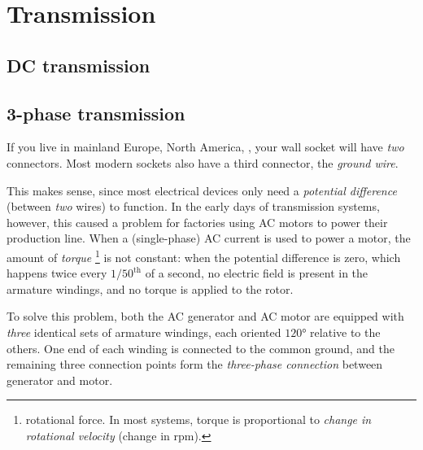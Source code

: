 \documentclass[main.tex]{subfiles}
\begin{document}
\section{Transmission}
\subsection{DC transmission}


\subsection{3-phase transmission}

\towrite{}

If you live in mainland Europe, North America, \todo{}, your wall socket will have \emph{two} connectors. Most modern sockets also have a third connector, the \emph{ground wire}. 

This makes sense, since most electrical devices only need a \emph{potential difference} (between \emph{two} wires) to function. In the early days of transmission systems, however, this caused a problem for factories using AC motors to power their production line. When a (single-phase) AC current is used to power a motor, the amount of \emph{torque} 
\footnote{\ie rotational force. In most systems, torque is proportional to \emph{change in rotational velocity} (change in rpm).}
is not constant: when the potential difference is zero, which happens twice every $1/50^{\text{th}}$ of a second, no electric field is present in the armature windings, and no torque is applied to the rotor. 

To solve this problem, both the AC generator and AC motor are equipped with \emph{three} identical sets of armature windings, each oriented $120 \si{\degree}$ relative to the others. One end of each winding is connected to the common ground, and the remaining three connection points form the \emph{three-phase connection} between generator and motor. 
\end{document}
